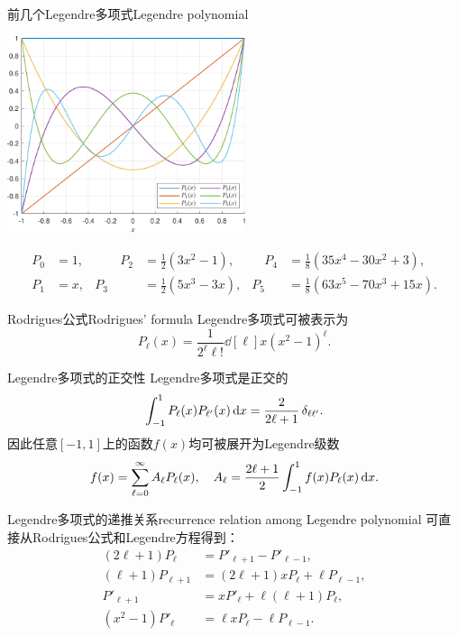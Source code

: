 \begin{example}{前几个Legendre多项式}{Legendre polynomial}
    \begin{center}
        \includegraphics[width=7cm]{graphs/Legendre.pdf}
    \end{center}
    \begin{equation*}
        \begin{aligned}
            P_0&=1,&\qquad P_2&=\frac12(3x^2-1),&\quad P_4&=\frac18(35x^4-30x^2+3),\\
            P_1&=x,&P_3&=\frac12(5x^3-3x),&P_5&=\frac18(63x^5-70x^3+15x).
        \end{aligned}
    \end{equation*}
\end{example}
\begin{theorem}{Rodrigues公式}{Rodrigues' formula}
    Legendre多项式可被表示为
    \begin{equation}
        \label{eqn:Rodrigues}
        P_\ell(x)=\frac1{2^\ell\ell!}\dd[\ell]x(x^2-1)^\ell.
    \end{equation}
\end{theorem}
\begin{theorem}
    {Legendre多项式的正交性}{}
    Legendre多项式是正交的
    \[
        \int_{-1}^1P_\ell(x)P_{\ell'}(x)\mathop{}\!\mathrm{d} x=\frac2{2\ell+1}\mathop{}\!\delta_{\ell\ell'}.
    \]
    因此任意$[-1,1]$上的函数$f(x)$均可被展开为Legendre级数
    \[
        f(x)=\sum_{\ell=0}^\infty A_\ell P_\ell(x),\quad A_\ell=\frac{2\ell+1}2\int_{-1}^1f(x)P_\ell(x)\mathop{}\!\mathrm{d} x.
    \]
\end{theorem}
\begin{theorem}{Legendre多项式的递推关系}{recurrence relation among Legendre polynomial}
    可直接从Rodrigues公式和Legendre方程得到：
    \begin{subequations}
        \begin{align}
            \label{eqn:Legendre recurrence 1}
            (2\ell+1)P_\ell&=P'_{\ell+1}-P'_{\ell-1},\\
            (\ell+1)P_{\ell+1}&=(2\ell+1)xP_\ell+\ell P_{\ell-1},\\
            P'_{\ell+1}&=xP'_\ell+\ell(\ell+1)P_\ell,\\
            (x^2-1)P'_\ell&=\ell xP_\ell-\ell P_{\ell-1}.
        \end{align}
    \end{subequations}
\end{theorem}
